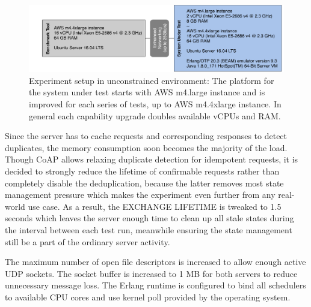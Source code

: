 \begin{figure}[!htbp]
\centering
\includegraphics[scale = 0.8]{experiment_setting_aws}
\caption[Experiment setup in unconstrained environment]{Experiment setup in unconstrained environment: The platform for the system under test starts with AWS m4.large instance and is improved for each series of tests, up to AWS m4.4xlarge instance. In general each capability upgrade doubles available vCPUs and RAM.} 
\label{fig:experiment_setting_aws}
\end{figure}

Since the server has to cache requests and corresponding responses to detect duplicates, the memory consumption soon becomes the majority of the load. Though CoAP allows relaxing duplicate detection for idempotent requests, it is decided to strongly reduce the lifetime of confirmable requests rather than completely disable the deduplication, because the latter removes most state management pressure which makes the experiment even further from any real-world use case. As a result, the EXCHANGE LIFETIME is tweaked to 1.5 seconds which leaves the server enough time to clean up all stale states during the interval between each test run, meanwhile ensuring the state management still be a part of the ordinary server activity.

The maximum number of open file descriptors is increased to allow enough active UDP sockets. The socket buffer is increased to 1 MB for both servers to reduce unnecessary message loss. The Erlang runtime is configured to bind all schedulers to available CPU cores and use kernel poll provided by the operating system. 

